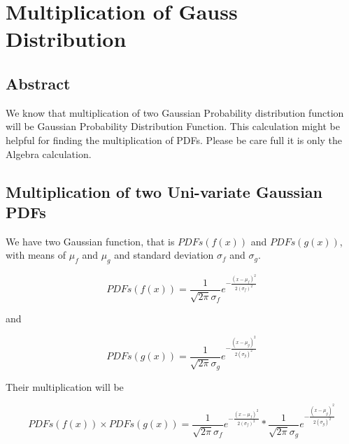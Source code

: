 
\chapter{Multiplication of Gauss Distribution } %

\label{chapter 1} %


\newcommand{\keyword}[1]{\textbf{#1}}
\newcommand{\tabhead}[1]{\textbf{#1}}
\newcommand{\code}[1]{\texttt{#1}}
\newcommand{\file}[1]{\texttt{\bfseries#1}}
\newcommand{\option}[1]{\texttt{\itshape#1}}


\section{Abstract}

We know that multiplication of two Gaussian Probability distribution function will be Gaussian Probability Distribution Function. This calculation might be helpful for finding the multiplication of PDFs. Please be care full it is only the Algebra calculation.





\section{Multiplication of two Uni-variate Gaussian PDFs}

We have two Gaussian function, that is $PDFs(f(x))$ and $PDFs(g(x))$, with means of $\mu_f$ and $\mu_g$ and standard deviation $\sigma_f$ and $\sigma_g$.

$$PDFs(f(x)) = \frac{1}{\sqrt{2\pi}\sigma_f}{e^{-\frac{{(x-\mu _f)}^2}{2{(\sigma_f)}^2}}}$$

and 

$$PDFs(g(x)) = \frac{1}{\sqrt{2\pi}\sigma_g}{e^{-\frac{{(x-\mu _g)}^2}{2{(\sigma_g)}^2}}}$$

 Their multiplication will be 
 
 \begin{equation}
     PDFs(f(x)) \times PDFs(g(x)) = \frac{1}{\sqrt{2\pi}\sigma_f}{e^{-\frac{{(x-\mu _f)}^2}{2{(\sigma_f)}^2}}} * {\frac{1}{\sqrt{2\pi}\sigma_g}{e^{-\frac{{(x-\mu _g)}^2}{2{(\sigma_g)}^2}}}}
\end{equation}

